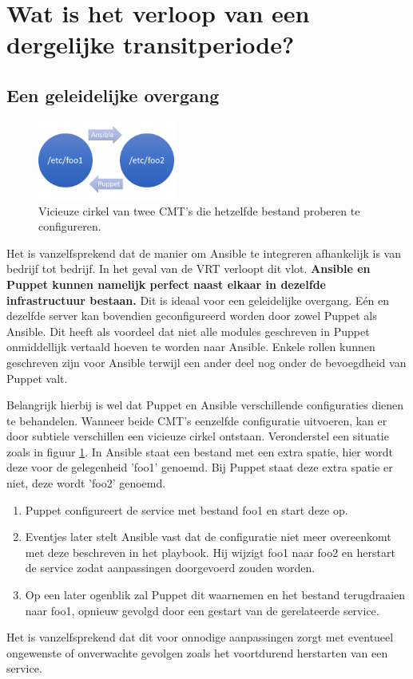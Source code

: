 \section{Wat is het verloop van een dergelijke transitperiode?}
\label{sec:methodologie-verloop-transit}
\subsection{Een geleidelijke overgang}


\begin{figure}
\centering
\includegraphics[width=0.4\textwidth]{img/vicieuzecirkel.PNG}
\caption{\label{fig:vicieuzecirkel}Vicieuze cirkel van twee \gls{CMT}'s die hetzelfde bestand proberen te configureren.}
\end{figure}

Het is vanzelfsprekend dat de manier om Ansible te integreren afhankelijk is van bedrijf tot bedrijf. In het geval van de VRT verloopt dit vlot. \textbf{Ansible en Puppet kunnen namelijk perfect naast elkaar in dezelfde infrastructuur bestaan.} Dit is ideaal voor een geleidelijke overgang. E\'en en dezelfde server kan bovendien geconfigureerd worden door zowel Puppet als Ansible. Dit heeft als voordeel dat niet alle modules geschreven in Puppet onmiddellijk vertaald hoeven te worden naar Ansible. Enkele rollen kunnen geschreven zijn voor Ansible terwijl een ander deel nog onder de bevoegdheid van Puppet valt.

 Belangrijk hierbij is wel dat Puppet en Ansible verschillende configuraties dienen te behandelen. Wanneer beide \gls{CMT}'s eenzelfde configuratie uitvoeren, kan er door subtiele verschillen een vicieuze cirkel ontstaan.
Veronderstel een situatie zoals in figuur \ref{fig:vicieuzecirkel}. In Ansible staat een bestand met een extra spatie, hier wordt deze voor de gelegenheid 'foo1' genoemd. Bij Puppet staat deze extra spatie er niet, deze wordt 'foo2' genoemd. 
\begin{enumerate}
\item Puppet configureert de service met bestand foo1 en start deze op.
\item  Eventjes later stelt Ansible vast dat de configuratie niet meer overeenkomt met deze beschreven in het playbook. Hij wijzigt foo1 naar foo2 en herstart de service zodat aanpassingen doorgevoerd zouden worden.
\item  Op een later ogenblik zal Puppet dit waarnemen en het bestand terugdraaien naar foo1, opnieuw gevolgd door een gestart van de gerelateerde service.
\end{enumerate}
Het is vanzelfsprekend dat dit voor onnodige aanpassingen zorgt met eventueel ongewenste of onverwachte gevolgen zoals het voortdurend herstarten van een service.

